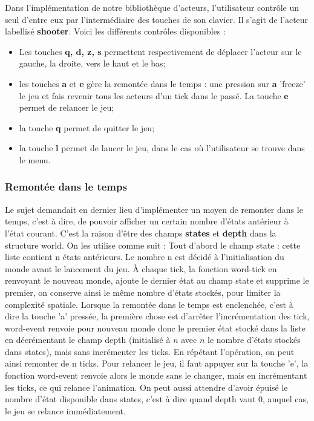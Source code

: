 \documentclass[a4paper,10pt]{article}
\begin{document}
Dans l'implémentation de notre bibliothèque d'acteurs, l'utilisateur contrôle un seul d'entre eux par l'intermédiaire des touches de son clavier. Il s'agit de l'acteur labellisé \textbf{shooter}. Voici les différents contrôles disponibles : \\
\begin{itemize}
    \item Les touches \textbf{q, d, z, s} permettent respectivement de déplacer l'acteur sur le gauche, la droite, vers le haut et le bas; \\
    \item les touches \textbf{a} et \textbf{e} gère la remontée dans le temps : une pression sur \textbf{a} 'freeze' le jeu et fais revenir tous les acteurs d'un tick dans le passé. La touche \textbf{e} permet de relancer le jeu; \\
    \item la touche \textbf{q} permet de quitter le jeu;\\
    \item la touche \textbf{l} permet de lancer le jeu, dans le cas où l'utilisateur se trouve dans le menu. \\
\end{itemize}
\hfill
\newline

\subsubsection{Remontée dans le temps}
Le sujet demandait en dernier lieu d'implémenter un moyen de remonter dans le temps, c'est à dire, de pouvoir afficher un certain nombre d'états antérieur à l'état courant. C'est la raison d'être des champs \textbf{states} et \textbf{depth} dans la structure world. On les utilise comme suit : 
Tout d'abord le champ state : cette liste contient n états antérieurs. Le nombre n est décidé à l'initialisation du monde avant le lancement du jeu. À chaque tick, la fonction word-tick en renvoyant le nouveau monde, ajoute le dernier état au champ state et supprime le premier, on conserve ainsi le même nombre d'états stockés, pour limiter la complexité spatiale.
Lorsque la remontée dans le temps est enclenchée, c'est à dire la touche 'a' pressée, la première chose est d'arrêter l'incrémentation des tick, word-event renvoie pour nouveau monde donc le premier état stocké dans la liste en décrémentant le champ depth (initialisé à $n$ avec $n$ le nombre d'états stockés dans states), mais sans incrémenter les ticks. En répétant l'opération, on peut ainsi remonter de n ticks. Pour relancer le jeu, il faut appuyer sur la touche 'e', la fonction word-event renvoie alors le monde sans le changer, mais en incrémentant les ticks, ce qui relance l'animation. On peut  aussi attendre d'avoir épuisé le nombre d'état disponible dans states, c'est à dire quand depth vaut 0, auquel cas, le jeu se relance immédiatement. 
\end{document}

